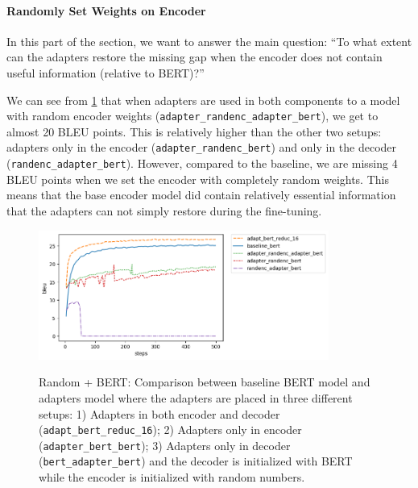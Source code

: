 \paragraph{Randomly Set Weights on Encoder}
In this part of the section, we want to answer the main question: ``To what extent can the adapters restore the missing gap when the encoder does not contain useful information (relative to BERT)?''

We can see from \cref{img:adapt_bert_randenc} that when adapters are used in both components to a model with random encoder weights (\texttt{adapter\_randenc\_adapter\_bert}), we get to almost 20 BLEU points. This is relatively higher than the other two setups: adapters only in the encoder (\texttt{adapter\_randenc\_bert}) and only in the decoder (\texttt{randenc\_adapter\_bert}). However, compared to the baseline, we are missing 4 BLEU points when we set the encoder with completely random weights. This means that the base encoder model did contain relatively essential information that the adapters can not simply restore during the fine-tuning.

\begin{figure}[t]
    {\includegraphics[width=0.85\textwidth]{img/adapter_bert_randenc.png}}
    \centering
    \caption[Random + BERT: Comparison for model with adapters in the decoder and the encoder is initalized with random weights.]{Random + BERT: Comparison between baseline BERT model and adapters model where the adapters are placed in three different setups: 1) Adapters in both encoder and decoder (\texttt{adapt\_bert\_reduc\_16}); 2) Adapters only in encoder (\texttt{adapter\_bert\_bert}); 3) Adapters only in decoder (\texttt{bert\_adapter\_bert}) and the decoder is initialized with BERT while the encoder is initialized with random numbers.}
    \label{img:adapt_bert_randenc}
\end{figure}


